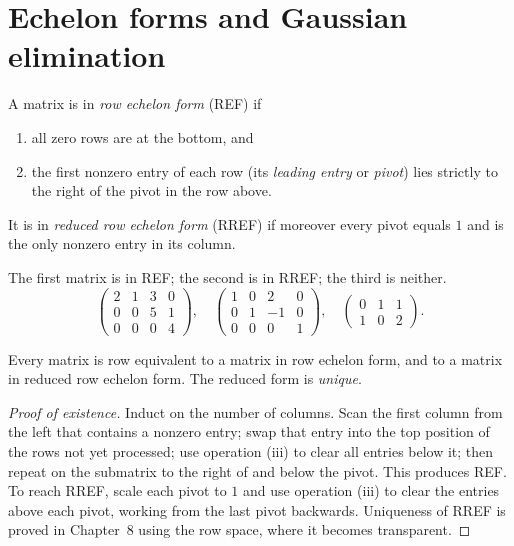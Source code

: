 \section{Echelon forms and Gaussian elimination}

\begin{definition}
A matrix is in \emph{row echelon form} (REF) if
\begin{enumerate}[label=(\roman*)]
  \item all zero rows are at the bottom, and
  \item the first nonzero entry of each row (its \emph{leading entry} or \emph{pivot}) lies strictly to the right of the pivot in the row above.
\end{enumerate}
It is in \emph{reduced row echelon form} (RREF) if moreover every pivot equals $1$ and is the only nonzero entry in its column.
\end{definition}

\begin{example}
The first matrix is in REF; the second is in RREF; the third is neither.
\[
\begin{pmatrix}2&1&3&0\\0&0&5&1\\0&0&0&4\end{pmatrix},\quad
\begin{pmatrix}1&0&2&0\\0&1&-1&0\\0&0&0&1\end{pmatrix},\quad
\begin{pmatrix}0&1&1\\1&0&2\end{pmatrix}.
\]
\end{example}

\begin{theorem}\label{thm:gauss}
Every matrix is row equivalent to a matrix in row echelon form, and to a matrix in reduced row echelon form. The reduced form is \emph{unique}.
\end{theorem}

\begin{proof}[Proof of existence]
Induct on the number of columns. Scan the first column from the left that contains a nonzero entry; swap that entry into the top position of the rows not yet processed; use operation (iii) to clear all entries below it; then repeat on the submatrix to the right of and below the pivot. This produces REF. To reach RREF, scale each pivot to $1$ and use operation (iii) to clear the entries above each pivot, working from the last pivot backwards. Uniqueness of RREF is proved in Chapter~8 using the row space, where it becomes transparent.
\end{proof}

